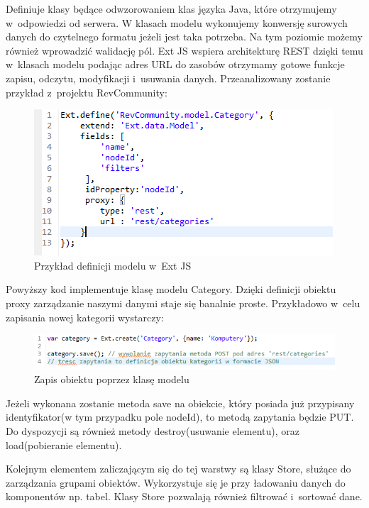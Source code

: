 Definiuje klasy będące odwzorowaniem klas języka Java, które otrzymujemy w~odpowiedzi od serwera. W klasach modelu wykonujemy konwersję surowych danych do czytelnego formatu jeżeli jest taka potrzeba. Na tym poziomie możemy również wprowadzić walidację pól. Ext JS wspiera architekturę REST dzięki temu w~klasach modelu podając adres URL do zasobów otrzymamy gotowe funkcje zapisu, odczytu, modyfikacji i~usuwania danych. Przeanalizowany zostanie przykład z~projektu RevCommunity:

\begin{figure}[H]
	\centering
	\includegraphics[width=\textwidth]{images/ext_model.png}
	\caption{Przykład definicji modelu w~Ext JS}
\end{figure}

Powyższy kod implementuje klasę modelu Category. Dzięki definicji obiektu proxy zarządzanie naszymi danymi staje się banalnie proste. Przykładowo w~celu zapisania nowej kategorii wystarczy:

\begin{figure}[H]
	\centering
	\includegraphics[width=\textwidth]{images/save_model.png}
	\caption{Zapis obiektu poprzez klasę modelu}
\end{figure}

Jeżeli wykonana zostanie metoda save na obiekcie, który posiada już przypisany identyfikator(w tym przypadku pole nodeId), to metodą zapytania będzie PUT.
Do dyspozycji są również metody destroy(usuwanie elementu), oraz load(pobieranie elementu).

Kolejnym elementem zaliczającym się do tej warstwy są klasy Store, służące do zarządzania grupami obiektów. Wykorzystuje się je przy ładowaniu danych do komponentów np. tabel. 
Klasy Store pozwalają również filtrować i~sortować dane.

